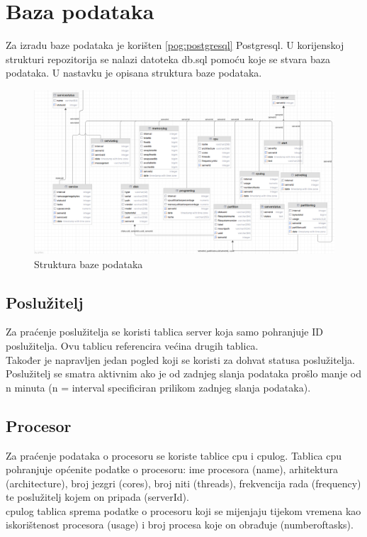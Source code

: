 \documentclass[zavrsnirad]{fer}
\begin{document}
\chapter{Baza podataka}
Za izradu baze podataka je korišten \ref{pog:postgresql} Postgresql. U korijenskoj strukturi repozitorija se nalazi datoteka db.sql pomoću koje se stvara baza podataka. U nastavku je opisana struktura baze podataka.
\begin{figure}[htb!]
	\centering
	\includegraphics[width=1.15\linewidth]{images/db_structure.png} 
	\caption{Struktura baze podataka}
	\label{slk:db_structure}
\end{figure}

\section{Poslužitelj}
Za praćenje poslužitelja se koristi tablica server koja samo pohranjuje ID poslužitelja. Ovu tablicu referencira većina drugih tablica.
\\Također je napravljen jedan pogled koji se koristi za dohvat statusa poslužitelja. Poslužitelj se smatra aktivnim ako je od zadnjeg slanja podataka prošlo manje od n minuta (n = interval specificiran prilikom zadnjeg slanja podataka).


\section{Procesor}
Za praćenje podataka o procesoru se koriste tablice cpu i cpulog. Tablica cpu pohranjuje općenite podatke o procesoru: ime procesora (name), arhitektura (architecture), broj jezgri (cores), broj niti (threads), frekvencija rada (frequency) te poslužitelj kojem on pripada (serverId).
\\cpulog tablica sprema podatke o procesoru koji se mijenjaju tijekom vremena kao iskorištenost procesora (usage) i broj procesa koje on obrađuje (numberoftasks).
\end{document}
